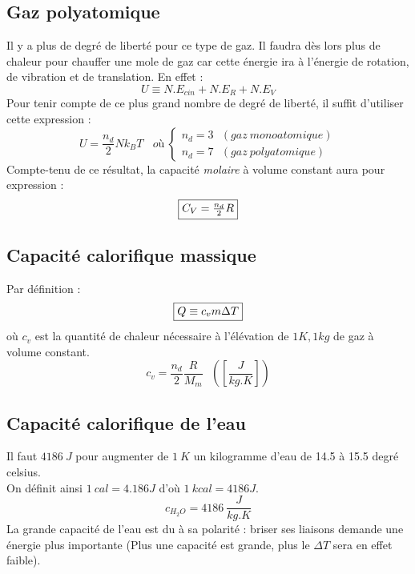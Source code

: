 \documentclass	[11pt, a4paper, openany]{book}
\begin{document}
\subsection{Gaz polyatomique}
Il y a plus de degré de liberté pour ce type de gaz. Il faudra dès lors plus de chaleur pour chauffer une mole de gaz car cette énergie ira à l'énergie de rotation, de vibration et de translation. En effet :
\begin{equation}
	U \equiv N.E_{cin} + N.E_R + N.E_V
\end{equation}
Pour tenir compte de ce plus grand nombre de degré de liberté, il suffit d'utiliser cette expression :
\begin{equation}
	U = \frac{n_d}{2}Nk_BT\ \ \ \ où \ \left\{\begin{array}{l}
	n_d = 3 \ \ \ (gaz\ monoatomique)\\
	n_d = 7 \ \ \ (gaz\ polyatomique)
	\end{array}\right.
\end{equation}
Compte-tenu de ce résultat, la capacité \textit{molaire} à volume constant aura pour expression :
\begin{equation}
	\fbox{$ C_V = \frac{n_d}{2}R$}
\end{equation}

\subsection{Capacité calorifique massique}
Par définition :
\begin{equation}
	\fbox{$ Q \equiv c_v m \Delta T$}
\end{equation}
où $c_v$ est la quantité de chaleur nécessaire à l'élévation de $1K, 1kg$ de gaz à volume constant.
\begin{equation}
	c_v = \frac{n_d}{2}\frac{R}{M_m}\ \ \ \left(\left[\frac{J}{kg.K}\right]\right)
\end{equation}

\subsection{Capacité calorifique de l'eau}
Il faut $4186\ J$ pour augmenter de $1\ K$ un kilogramme d'eau de 14.5 à 15.5 degré celsius.\\
On définit ainsi $1\ cal = 4.186J$ d'où $1\ kcal = 4186J$.
\begin{equation}
	c_{H_2O} = 4186\ \frac{J}{kg.K}
\end{equation}
La grande capacité de l'eau est du à sa polarité : briser ses liaisons demande une énergie plus importante (Plus une capacité est grande, plus le $\Delta T$ sera en effet faible).
\end{document}
